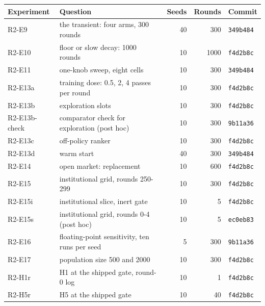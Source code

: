 \small
\begin{tabular}{llrrl}
\hline
Experiment & Question & Seeds & Rounds & Commit \\
\hline
R2-E9 & the transient: four arms, 300 rounds & 40 & 300 & \texttt{349b484} \\
R2-E10 & floor or slow decay: 1000 rounds & 10 & 1000 & \texttt{f4d2b8c} \\
R2-E11 & one-knob sweep, eight cells & 10 & 300 & \texttt{349b484} \\
R2-E13a & training dose: 0.5, 2, 4 passes per round & 10 & 300 & \texttt{f4d2b8c} \\
R2-E13b & exploration slots & 10 & 300 & \texttt{f4d2b8c} \\
R2-E13b-check & comparator check for exploration (post hoc) & 10 & 300 & \texttt{9b11a36} \\
R2-E13c & off-policy ranker & 10 & 300 & \texttt{f4d2b8c} \\
R2-E13d & warm start & 40 & 300 & \texttt{349b484} \\
R2-E14 & open market: replacement & 10 & 600 & \texttt{f4d2b8c} \\
R2-E15 & institutional grid, rounds 250-299 & 10 & 300 & \texttt{f4d2b8c} \\
R2-E15i & institutional slice, inert gate & 10 & 5 & \texttt{f4d2b8c} \\
R2-E15s & institutional grid, rounds 0-4 (post hoc) & 10 & 5 & \texttt{ec0eb83} \\
R2-E16 & floating-point sensitivity, ten runs per seed & 5 & 300 & \texttt{9b11a36} \\
R2-E17 & population size 500 and 2000 & 10 & 300 & \texttt{f4d2b8c} \\
R2-H1r & H1 at the shipped gate, round-0 log & 10 & 1 & \texttt{f4d2b8c} \\
R2-H5r & H5 at the shipped gate & 10 & 40 & \texttt{f4d2b8c} \\
\hline
\end{tabular}
